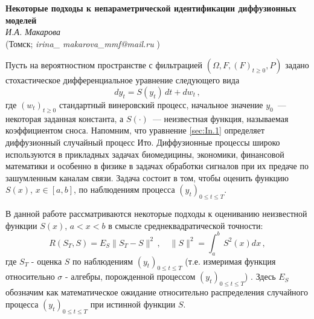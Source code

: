 \begin{center}{ \bf  Некоторые подходы к непараметрической идентификации диффузионных моделей}\\
{\it И.А. Макарова } \\
(Томск; {\it irina\_ makarova\_mmf@mail.ru} )
\end{center}


Пусть на вероятностном пространстве с фильтрацией $(\Omega, F, (F)_{t\ge 0}, P)$ задано стохастическое дифференциальное уравнение следующего вида
 \begin{equation}\label{sec:In.1}
d y_{t}=S(y_{t})\,d t +d w_{t}\,,
 \end{equation}
где $(w_{t})_{t\ge 0}$ стандартный винеровский процесс,
начальное значение $y_{0}$~--- некоторая заданная константа,
а $S(\cdot)$~--- неизвестная функция, называемая коэффициентом сноса.
Напомним, что уравнение \eqref{sec:In.1} определяет диффузионный случайный процесс Ито.
Диффузионные процессы широко используются в прикладных задачах биомедицины, экономики, финансовой математики и особенно в физике в задачах обработки сигналов при их предаче по зашумленным каналам связи.
Задача состоит в том, чтобы оценить функцию $S(x)$, $x\in[a,b]$, по наблюдениям процесса
$(y_{t})_{0\le t\le T}$.

В данной работе рассматриваются некоторые подходы к оцениванию неизвестной функции $S(x)$, $a<x<b$ в смысле среднеквадратической точности:
\begin{equation}\label{sec:In.2}
R({S}_{T},S)=E_{S}\|{S}_{T}-S\|^2\,,
\quad
\|S\|^2=\int^b_{a}\,S^2(x)d x\,,
\end{equation}
где ${S}_{T}$ - оценка
$S$ по наблюдениям $(y_{t})_{0\le t\le T}$ (т.е. измеримая функция относительно $\sigma$ - алгебры, порожденной процессом $(y_{t})_{0\le t\le T}$) . Здесь $E_{S}$ обозначим как математическое ожидание относительно распределения случайного процесса
 $(y_{t})_{0\le t\le T}$ при истинной функции $S$.

